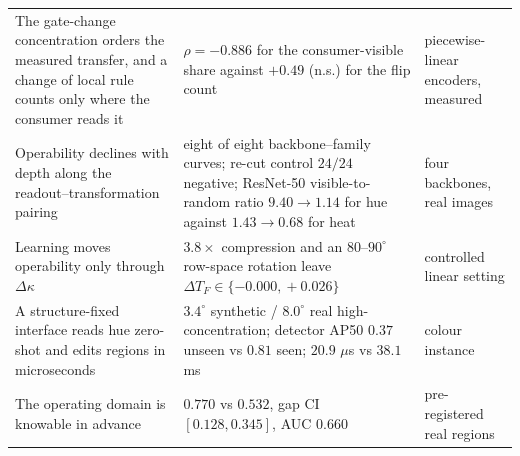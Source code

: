 \begin{table}[t]
\begin{tabularx}{\textwidth}{@{}>{\raggedright\arraybackslash}X >{\raggedright\arraybackslash}X >{\raggedright\arraybackslash}X@{}}
The gate-change concentration orders the measured transfer, and a change of local rule counts only where the consumer reads it & $\rho=-0.886$ for the consumer-visible share against $+0.49$ (n.s.) for the flip count & piecewise-linear encoders, measured \\
Operability declines with depth along the readout--transformation pairing & eight of eight backbone--family curves; re-cut control $24/24$ negative; ResNet-50 visible-to-random ratio $9.40\to1.14$ for hue against $1.43\to0.68$ for heat & four backbones, real images \\
Learning moves operability only through $\Delta\kappa$ & $3.8\times$ compression and an $80$--$90^\circ$ row-space rotation leave $\Delta T_F\in\{-0.000,\allowbreak{}+0.026\}$ & controlled linear setting \\
A structure-fixed interface reads hue zero-shot and edits regions in microseconds & $3.4^\circ$ synthetic / $8.0^\circ$ real high-concentration; detector AP50 $0.37$ unseen vs $0.81$ seen; $20.9$ $\mu$s vs $38.1$ ms & colour instance \\
The operating domain is knowable in advance & $0.770$ vs $0.532$, gap CI $[0.128,\allowbreak{}0.345]$, AUC $0.660$ & 750 pre-registered real regions \\
\bottomrule
\end{tabularx}
\end{table}
